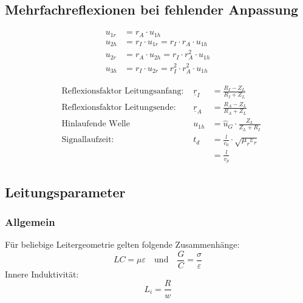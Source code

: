 \subsection{Mehrfachreflexionen bei fehlender Anpassung}

\begin{align*}
    u_{1r} & = r_A\cdot u_{1h}                                \\
    u_{2h} & = r_I\cdot u_{1r} = r_I\cdot r_A\cdot u_{1h}     \\
    u_{2r} & = r_A\cdot u_{2h} = r_I\cdot r_A^2\cdot u_{1h}   \\
    u_{3h} & = r_I\cdot u_{2r} = r_I^2\cdot r_A^2\cdot u_{1h}
\end{align*}

\begin{align*}
     & \text{Reflexionsfaktor Leitungsanfang: } & \underline{r}_I & = \frac{R_I - Z_L}{R_I + Z_L}                 \\
     & \text{Reflexionsfaktor Leitungsende: }   & \underline{r}_A & = \frac{R_A - Z_L}{R_A + Z_L}                 \\
     & \text{Hinlaufende Welle}                 & u_{1h}          & = \hat{u}_G \cdot\frac{Z_L}{Z_L+R_I}          \\
     & \text{Signallaufzeit: }                  & t_d             & = \frac{l}{c_0}\cdot\sqrt{\mu_r\varepsilon_r} \\
     &                                          &                 & = \frac{l}{v_p}
\end{align*}
\subsection{Leitungsparameter}
				\subsubsection{Allgemein}
Für beliebige Leitergeometrie gelten folgende Zusammenhänge:
\[
\boxed{LC = \mu\varepsilon} \quad \text{und} \quad \boxed{\frac{G}{C} = \frac{\sigma}{\varepsilon}}
\]
Innere Induktivität:
\[
L_i = \frac{R}{w}
\]
\textbf{\color{red}{Leitungen gehen HIN und ZURÜCK!!!}\\
	\color{red}{Länge verdoppeln!!!}
}
